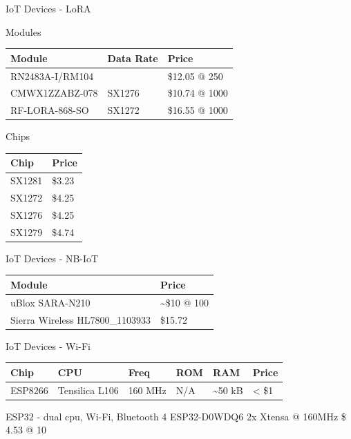 \begin{frame}{IoT Devices - LoRA}
\protect\hypertarget{iot-devices---lora}{}

\begin{block}{Modules}

\begin{longtable}[]{@{}lll@{}}
\toprule
Module & Data Rate & Price\tabularnewline
\midrule
\endhead
RN2483A-I/RM104 & & \$12.05 @ 250\tabularnewline
CMWX1ZZABZ-078 & SX1276 & \$10.74 @ 1000\tabularnewline
RF-LORA-868-SO & SX1272 & \$16.55 @ 1000\tabularnewline
\bottomrule
\end{longtable}

\end{block}

\begin{block}{Chips}

\begin{longtable}[]{@{}ll@{}}
\toprule
Chip & Price\tabularnewline
\midrule
\endhead
SX1281 & \$3.23\tabularnewline
SX1272 & \$4.25\tabularnewline
SX1276 & \$4.25\tabularnewline
SX1279 & \$4.74\tabularnewline
\bottomrule
\end{longtable}


\end{block}

\end{frame}

\begin{frame}{IoT Devices - NB-IoT}
\protect\hypertarget{iot-devices---nb-iot}{}

\begin{longtable}[]{@{}ll@{}}
\toprule
Module & Price\tabularnewline
\midrule
\endhead
uBlox SARA-N210 & \textasciitilde{}\$10 @ 100\tabularnewline
Sierra Wireless HL7800\_1103933 & \$15.72\tabularnewline
\bottomrule
\end{longtable}

\end{frame}

\begin{frame}{IoT Devices - Wi-Fi}
\protect\hypertarget{iot-devices---wi-fi}{}

\begin{longtable}[]{@{}llllll@{}}
\toprule
Chip & CPU & Freq & ROM & RAM & Price\tabularnewline
\midrule
\endhead
ESP8266 & Tensilica L106 & 160 MHz & N/A & \textasciitilde{}50 kB &
\textless{} \$1\tabularnewline
\bottomrule
\end{longtable}

ESP32 - dual cpu, Wi-Fi, Bluetooth 4 ESP32-D0WDQ6 2x Xtensa @ 160MHz \$
4.53 @ 10


\end{frame}

